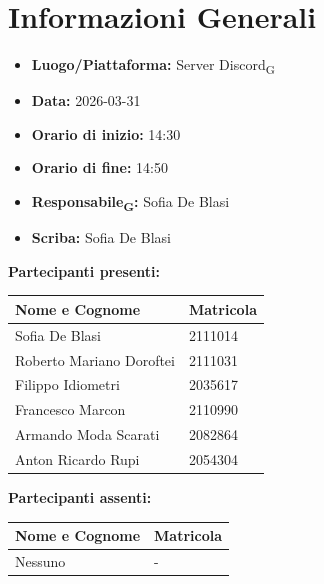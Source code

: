 \section{Informazioni Generali}
\begin{itemize}
	\item \textbf{Luogo/Piattaforma:} Server Discord\textsubscript{G}
	\item \textbf{Data:} 2026-03-31
	\item \textbf{Orario di inizio:} 14:30
	\item \textbf{Orario di fine:} 14:50
	\item \textbf{Responsabile\textsubscript{G}:} Sofia De Blasi
	\item \textbf{Scriba:} Sofia De Blasi
\end{itemize}

\vspace{0.5cm}
\textbf{Partecipanti presenti:}
\begin{table}[ht]
	\centering
	\renewcommand{\arraystretch}{1.2}
	\begin{tabularx}{\textwidth}{X l}
		\toprule
		\textbf{Nome e Cognome} & \textbf{Matricola} \\
		\midrule
		Sofia De Blasi & 2111014 \\
		Roberto Mariano Doroftei & 2111031 \\
		Filippo Idiometri & 2035617 \\
		Francesco Marcon & 2110990 \\
		Armando Moda Scarati & 2082864 \\
		Anton Ricardo Rupi & 2054304 \\
		\bottomrule
	\end{tabularx}
\end{table}

\vspace{0.5cm}
\textbf{Partecipanti assenti:}
\begin{table}[ht]
	\centering
	\renewcommand{\arraystretch}{1.2}
	\begin{tabularx}{\textwidth}{X l}
		\toprule
		\textbf{Nome e Cognome} & \textbf{Matricola} \\
		\midrule
		Nessuno & - \\
		\bottomrule
	\end{tabularx}
\end{table}


